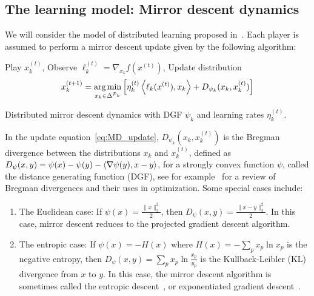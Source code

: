 \documentclass{sig-alternate-ipsn13}
\begin{document}
\subsection{The learning model: Mirror descent dynamics}
\label{sec:learning}
We will consider the model of distributed learning proposed in~\cite{krichene2015MD}. Each player is assumed to perform a mirror descent update given by the following algorithm:
\begin{algorithm}[H]
\small
\begin{algorithmic}[1]
\STATE Play $x^{(t)}_k$,
\STATE Observe $\ell_k^{(t)} = \nabla_{x_k} f(x^{(t)})$,
\STATE Update distribution
\begin{equation}
x^{(t+1)}_k = \operatorname*{arg\,min}_{x_k \in \Delta^{\mathcal{P}_k}} \left[ \eta_k^{(t)} \left\langle \ell_k(x^{(t)}), x_k \right\rangle + D_{\psi_k}(x_k, x^{(t)}_k) \right]
\label{eq:MD_update}
\end{equation}
\ENDFOR
\ENDFOR
\end{algorithmic}
\caption{\small Distributed mirror descent dynamics with DGF $\psi_k$ and learning rates $\eta_k^{(t)}$.}
\label{alg:MD}
\end{algorithm}
In the update equation~\eqref{eq:MD_update}, $D_{\psi_k}(x_k, x^{(t)}_k)$ is the Bregman divergence between the distributions $x_k$ and $x_k^{(t)}$, defined as $D_\psi(x, y) = \psi(x) - \psi(y) - \left\langle \nabla \psi(y), x - y \right\rangle$, for a strongly convex function $\psi$, called the distance generating function (DGF), see for example~\cite{censor1997parallel,banerjee2005clustering} for a review of Bregman divergences and their uses in optimization. Some special cases include:
\begin{enumerate}[label=\alph*)]
\item The Euclidean case: If $\psi(x) = \frac{\|x\|^2_2}{2}$, then $D_\psi(x, y) = \frac{\|x - y\|_2^2}{2}$. In this case, mirror descent reduces to the projected gradient descent algorithm.
\item The entropic case: If $\psi(x) = - H(x)$ where $H(x) = -\sum_{p} x_p \ln x_p$ is the negative entropy, then $D_\psi(x, y) = \sum_p x_p \ln \frac{x_p}{y_p}$ is the Kullback-Leibler (KL) divergence from $x$ to $y$. In this case, the mirror descent algorithm is sometimes called the entropic descent~\cite{beck2003mirror}, or exponentiated gradient descent~\cite{kivinen1997exponentiated}.
\end{enumerate}
\end{document}
